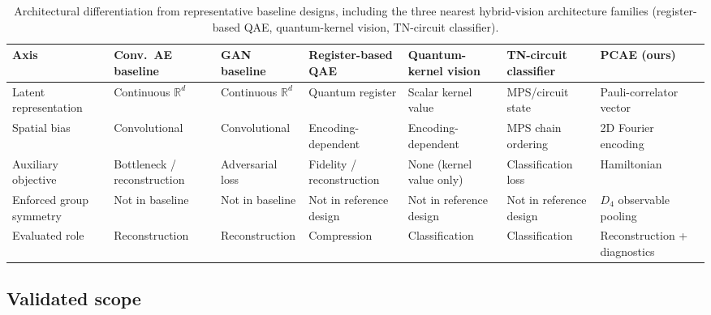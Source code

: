 \documentclass[pdflatex,sn-basic]{sn-jnl}
\DeclareRobustCommand{\blue}[1]{\leavevmode{\color{blue}#1}}
\begin{document}
\begin{table}[t]
  \centering
  \caption{Architectural differentiation from representative baseline designs,
           including the three nearest hybrid-vision architecture families
           (register-based QAE, quantum-kernel vision, TN-circuit classifier).}
  \label{tab:differentiation}
  \scriptsize
  \setlength{\tabcolsep}{3pt}
  \begin{tabularx}{\textwidth}{@{}L{0.13\textwidth} Y Y Y Y Y Y@{}}
    \toprule
    Axis
      & Conv.\ AE baseline
      & GAN baseline
      & Register-based QAE
      & Quantum-kernel vision
      & TN-circuit classifier
      & PCAE (ours) \\
    \midrule
    Latent representation
      & Continuous $\mathbb{R}^d$
      & Continuous $\mathbb{R}^d$
      & Quantum register
      & Scalar kernel value
      & MPS\slash circuit state
      & Pauli-correlator vector \\
    \addlinespace
    Spatial bias
      & Convolutional
      & Convolutional
      & Encoding-dependent
      & Encoding-dependent
      & MPS chain ordering
      & 2D Fourier encoding \\
    \addlinespace
    Auxiliary objective
      & Bottleneck / reconstruction
      & Adversarial loss
      & Fidelity / reconstruction
      & None (kernel value only)
      & Classification loss
      & Hamiltonian \blue{energy term} \\
    \addlinespace
    Enforced group symmetry
      & Not in baseline
      & Not in baseline
      & Not in reference design
      & Not in reference design
      & Not in reference design
      & $D_4$ observable pooling \\
    \addlinespace
    Evaluated role
      & Reconstruction
      & Reconstruction
      & Compression
      & Classification
      & Classification
      & Reconstruction + diagnostics \\
    \bottomrule
  \end{tabularx}
\end{table}

\subsection{Validated scope}
\label{sec:limitations}
\end{document}
